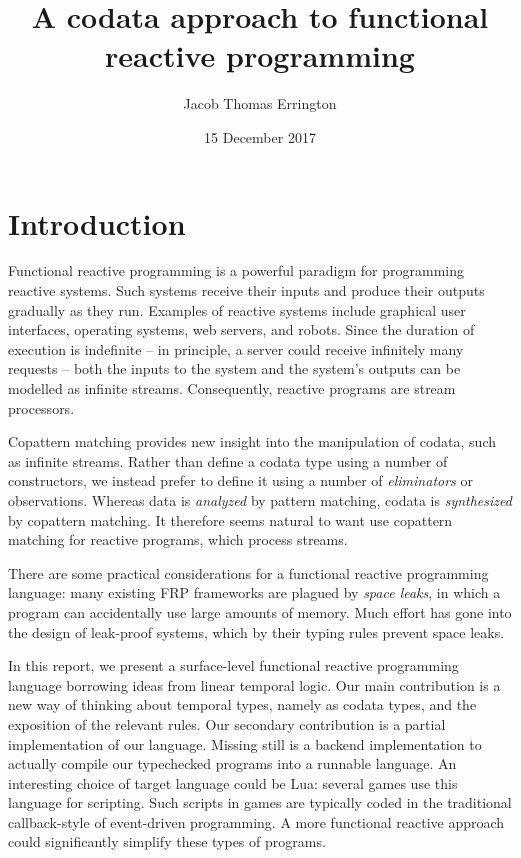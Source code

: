 \documentclass[acmsmall, natbib=false]{acmart}
\author{Jacob Thomas Errington}
\title{A codata approach to functional reactive programming}
\date{15 December 2017}
\begin{document}
\maketitle

\section{Introduction}

Functional reactive programming\cite{frp-hudak} is a powerful paradigm for
programming reactive systems.
Such systems receive their inputs and produce their outputs gradually as they
run. Examples of reactive systems include graphical user interfaces,
operating systems, web servers, and robots.
Since the duration of execution is indefinite -- in principle, a server could
receive infinitely many requests -- both the inputs to the system and the
system's outputs can be modelled as infinite streams.
Consequently, reactive programs are stream processors.

Copattern matching\cite{copatterns} provides new insight into the manipulation
of codata, such as infinite streams.
Rather than define a codata type using a number of constructors, we instead
prefer to define it using a number of \emph{eliminators} or observations.
Whereas data is \emph{analyzed} by pattern matching, codata is
\emph{synthesized} by copattern matching.
%
It therefore seems natural to want use copattern matching for reactive
programs, which process streams.

There are some practical considerations for a functional reactive programming
language: many existing FRP frameworks are plagued by \emph{space leaks}, in
which a program can accidentally use large amounts of memory.
Much effort has gone into the design of leak-proof
systems\cite{ltl,neelk1,neelk2,neelk3}, which by their typing rules prevent
space leaks.

In this report, we present a surface-level functional reactive programming
language borrowing ideas from linear temporal logic\cite{pnueli}.
%
Our main contribution is a new way of thinking about temporal types, namely as
codata types, and the exposition of the relevant rules.
Our secondary contribution is a partial implementation of our
language.
Missing still is a backend implementation to actually compile our typechecked
programs into a runnable language.
An interesting choice of target language could be Lua: several games use this
language for scripting. Such scripts in games are typically coded in the
traditional callback-style of event-driven programming. A more functional
reactive approach could significantly simplify these types of programs.
\end{document}
